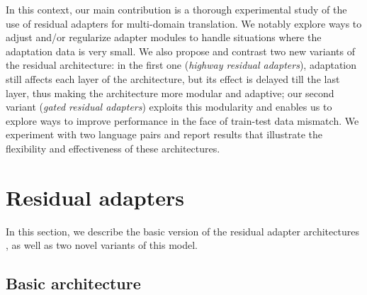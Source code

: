 \documentclass[11pt,a4paper]{article}
\newcommand{\fyDone}[1]{\done[FY]\Todo[FY:]{\textcolor{orange}{#1}}}
\newcommand{\fyFuture}[1]{\done[FY]\Todo[FY:]{\textcolor{red}{#1}}}
\begin{document}
In this context, our main contribution is a thorough experimental study of the use of residual adapters for multi-domain translation. We notably explore ways to adjust and/or regularize adapter modules to handle situations where the adaptation data is very small. We also propose and contrast two new variants of the residual architecture: in the first one (\emph{highway residual adapters}), adaptation still affects each layer of the architecture, but its effect is delayed till the last layer, thus making the architecture more modular and adaptive; our second variant (\emph{gated residual adapters}) exploits this modularity and enables us to explore ways to improve performance in the face of train-test data mismatch. We experiment with two language pairs and report results that illustrate the flexibility and effectiveness of these architectures. 
\fyDone{One bit of a conclusion here}\fyFuture{Build a proper training scenario for these two conditions}

\section{Residual adapters \label{sec:res}}
In this section, we describe the basic version of the residual adapter architectures \citep{houlsby19parameter, Bapna19simple}, as well as two novel variants of this model.

\subsection{Basic architecture \label{ssec:architecture}}
\fyDone{More contexts and notations from the transformer}\fyDone{Encoder / decoder layers}
\end{document}
